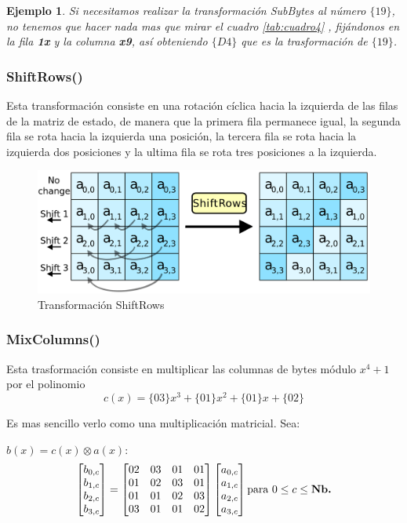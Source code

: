 \documentclass[peerreview]{IEEEtran}
\newtheorem{ejem}{\textbf{Ejemplo}}
\begin{document}
\begin{ejem}
	Si necesitamos realizar la transformación \textit{SubBytes} al número $\{19\}$, no tenemos que hacer nada mas que mirar el cuadro \ref{tab:cuadro4} , fijándonos  en la fila \textbf{1x} y la columna \textbf{x9}, así obteniendo $\{D4\}$ que es la trasformación de $\{19\}$.\\
	
\end{ejem}
\subsubsection{ShiftRows()}
Esta transformación consiste en una rotación cíclica hacia la izquierda de las
filas de la matriz de estado, de manera que la primera fila permanece igual, la
segunda fila se rota hacia la izquierda una posición, la tercera fila se rota
hacia la izquierda dos posiciones y la ultima fila se rota tres posiciones a la
izquierda.
\begin{figure}[h!]
  \includegraphics[scale=0.11]{figuras/ShiftRows.png}
  \centering
  \caption{Transformación ShiftRows}
  \label{fig: 4}
\end{figure}

\subsubsection{MixColumns()}
Esta trasformación consiste en multiplicar las columnas de bytes módulo $x^4 +
  1$ por el polinomio
\[c(x)=\{03\}x^3 + \{01\}x^2 + \{01\}x + \{02\}\]

Es mas sencillo verlo como una multiplicación matricial. Sea:

$b(x)= c(x)\otimes a(x):$
\[\begin{bmatrix}
	b_{0, c} \\
	b_{1, c} \\
	b_{2, c} \\
	b_{3, c} \\
\end{bmatrix} = \begin{bmatrix}
	02 & 03 & 01 & 01 \\
	01 & 02 & 03 & 01 \\
	01 & 01 & 02 & 03 \\
	03 & 01 & 01 & 02
\end{bmatrix} \begin{bmatrix}
	a_{0, c} \\
	a_{1, c} \\
	a_{2, c} \\
	a_{3, c} \\
\end{bmatrix} \text{para } 0 \leq c \leq \text{\textbf{Nb.}}\]
\end{document}
